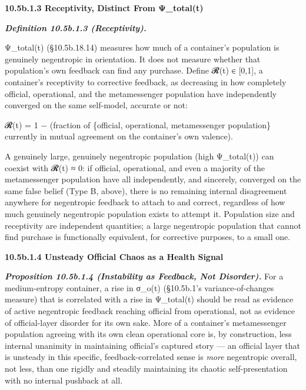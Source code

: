 \documentclass[
]{article}
\begin{document}
\textbf{10.5b.1.3 Receptivity, Distinct From Ψ\_total(t)}

\emph{\textbf{Definition 10.5b.1.3 (Receptivity).}}

Ψ\_total(t) (§10.5b.18.14) measures how much of a container's population
is genuinely negentropic in orientation. It does not measure whether
that population's own feedback can find any purchase. Define 𝓡(t) ∈
{[}0,1{]}, a container's receptivity to corrective feedback, as
decreasing in how completely official, operational, and the
metamessenger population have independently converged on the same
self-model, accurate or not:

𝓡(t) = 1 − (fraction of \{official, operational, metamessenger
population\} currently in mutual agreement on the container's own
valence).

A genuinely large, genuinely negentropic population (high Ψ\_total(t))
can coexist with 𝓡(t) ≈ 0: if official, operational, and even a majority
of the metamessenger population have all independently, and sincerely,
converged on the same false belief (Type B, above), there is no
remaining internal disagreement anywhere for negentropic feedback to
attach to and correct, regardless of how much genuinely negentropic
population exists to attempt it. Population size and receptivity are
independent quantities; a large negentropic population that cannot find
purchase is functionally equivalent, for corrective purposes, to a small
one.

\textbf{10.5b.1.4 Unsteady Official Chaos as a Health Signal}

\emph{\textbf{Proposition 10.5b.1.4 (Instability as Feedback, Not
Disorder).}} For a medium-entropy container, a rise in σ\_o(t)
(§10.5b.1's variance-of-changes measure) that is correlated with a rise
in Ψ\_total(t) should be read as evidence of active negentropic feedback
reaching official from operational, not as evidence of official-layer
disorder for its own sake. More of a container's metamessenger
population agreeing with its own clean operational core is, by
construction, less internal unanimity in maintaining official's captured
story --- an official layer that is unsteady in this specific,
feedback-correlated sense is \emph{more} negentropic overall, not less,
than one rigidly and steadily maintaining its chaotic self-presentation
with no internal pushback at all.
\end{document}
